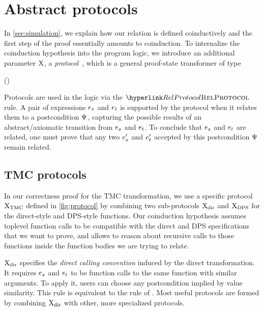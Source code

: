 \section{Abstract protocols} \label{sec:protocols} \label{subsec:protocols}



In \cref{sec:simulation}, we explain how our relation is defined coinductively and the first step of the proof essentially amounts to coinduction.
To internalize the coinduction hypothesis into the program logic, we introduce an additional parameter $\mathrm{X}$, a \emph{protocol}~\citep*{protocols-2021}, which is a general proof-state transformer of type
\begin{mathline}
(\datalangExpr[] \to \datalangExpr[] \to \iProp) \to \datalangExpr[] \to \datalangExpr[] \to \iProp
\end{mathline}

Protocols are used in the logic via the $\RefTirName{RelProtocol}$ rule.
A pair of expressions $\datalangExpr_s$ and $\datalangExpr_t$ is supported by the protocol when it relates them to a postcondition $\Psi$, capturing the possible results of an abstract/axiomatic transition from $\datalangExpr_s$ and $\datalangExpr_t$.
To conclude that $\datalangExpr_s$ and $\datalangExpr_t$ are related, one must prove that any two $\datalangExpr_s'$ and $\datalangExpr_t'$ accepted by this postcondition $\Psi$ remain related.

\subsection{TMC protocols}

In our correctness proof for the TMC transformation, we use a specific protocol $\mathrm{X}_\mathrm{TMC}$ defined in \cref{fig:protocol} by combining two sub-protocols $\mathrm{X}_\mathrm{dir}$ and $\mathrm{X}_\mathrm{DPS}$ for the direct-style and DPS-style functions. Our coinduction hypothesis assumes toplevel function calls to be compatible with the direct and DPS specifications that we want to prove, and allows to reason about recursive calls to those functions inside the function bodies we are trying to relate.

$\mathrm{X}_\mathrm{dir}$ specifies the \emph{direct calling convention} induced by the direct transformation.
It requires $\datalangExpr_s$ and $\datalangExpr_t$ to be function calls to the same function with similar arguments.
To apply it, users can choose any postcondition implied by value similarity.
This rule is equivalent to the  rule of \Simuliris.
Most useful protocols are formed by combining $\mathrm{X}_\mathrm{dir}$ with other, more specialized protocols.

